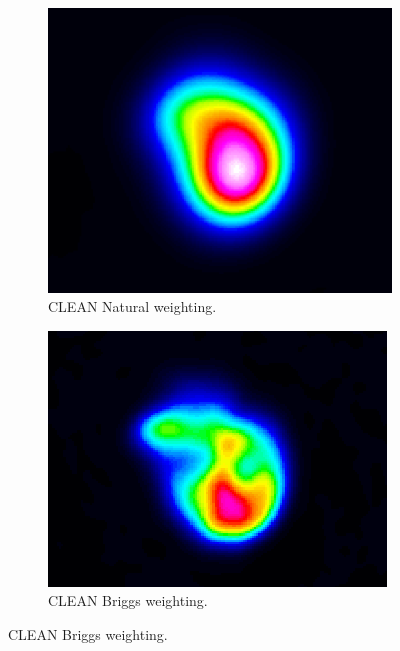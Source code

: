 \begin{figure}[h]
	\centering
	\begin{subfigure}[b]{0.3\linewidth}
		\includegraphics[width=1.00\linewidth]{./chapters/10.results/cleancomp/n132_clean.png}
		\caption{CLEAN Natural weighting.}
		\label{results:N132:clean}
	\end{subfigure}
	\begin{subfigure}[b]{0.3\linewidth}
		\includegraphics[width=1.00\linewidth]{./chapters/10.results/cleancomp/n132_clean_briggs.png}
		\caption{CLEAN Briggs weighting.}
		\label{results:N132:cleanbriggs}
	\end{subfigure}

\end{figure}
